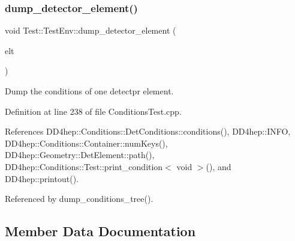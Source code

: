 \hypertarget{struct_d_d4hep_1_1_conditions_1_1_test_1_1_test_env_ab2a1c2b98a13f7f935e4aeb55dadf33a}{}\label{struct_d_d4hep_1_1_conditions_1_1_test_1_1_test_env_ab2a1c2b98a13f7f935e4aeb55dadf33a} 
\subsubsection{\texorpdfstring{dump\+\_\+detector\+\_\+element()}{dump\_detector\_element()}\hspace{0.1cm}{\footnotesize\ttfamily [2/2]}}
{\footnotesize\ttfamily void Test\+::\+Test\+Env\+::dump\+\_\+detector\+\_\+element (\begin{DoxyParamCaption}\item[{\hyperlink{class_d_d4hep_1_1_geometry_1_1_det_element}{Det\+Element}}]{elt }\end{DoxyParamCaption})\hspace{0.3cm}{\ttfamily [static]}}



Dump the conditions of one detectpr element. 



Definition at line 238 of file Conditions\+Test.\+cpp.



References D\+D4hep\+::\+Conditions\+::\+Det\+Conditions\+::conditions(), D\+D4hep\+::\+I\+N\+FO, D\+D4hep\+::\+Conditions\+::\+Container\+::num\+Keys(), D\+D4hep\+::\+Geometry\+::\+Det\+Element\+::path(), D\+D4hep\+::\+Conditions\+::\+Test\+::print\+\_\+condition$<$ void $>$(), and D\+D4hep\+::printout().



Referenced by dump\+\_\+conditions\+\_\+tree().



\subsection{Member Data Documentation}
\hypertarget{struct_d_d4hep_1_1_conditions_1_1_test_1_1_test_env_a08451dbdbf34ecff0e383bb617f78c29}{}\label{struct_d_d4hep_1_1_conditions_1_1_test_1_1_test_env_a08451dbdbf34ecff0e383bb617f78c29} 
